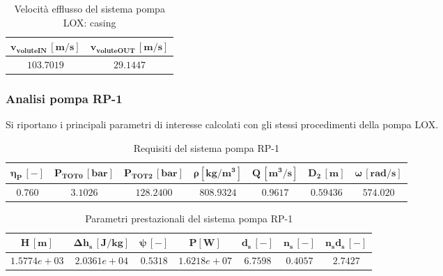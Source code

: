 \begin{table}[H]
\centering
\begin{tabular}{|c|c|}
\hline
$\bm{v_{voluteIN} \, [m/s]}$ & $\bm{v_{voluteOUT} \, [m/s]}$  \\
\hline
$103.7019$ & $29.1447$   \\
\hline
\end{tabular}

\caption{Velocità efflusso del sistema pompa LOX: casing}
\label{table:LOX pump casing}

\end{table}

\subsubsection{Analisi pompa RP-1}
Si riportano i principali parametri di interesse calcolati con gli stessi procedimenti della pompa LOX.

\begin{table}[H]
\centering
\begin{tabular}{|c|c|c|c|c|c|c|}
\hline
$\bm{\eta_P \, [-]}$ & $\bm{P_ {TOT0} \, [bar]}$ & $\bm{P_{TOT2} \, [bar]}$ & $\bm{\rho [kg/m^3]}$ & $\bm{Q \, [m^3/s]}$ & $\bm{D_2 \, [m]}$ & $\bm{\omega \, [rad/s]}$  \\
\hline
$0.760$ & $3.1026$ & $128.2400$ &  $808.9324$ & $0.9617$ & $0.59436$ & $574.020$  \\
\hline
\end{tabular}

\caption{Requisiti del sistema pompa RP-1 \cite{turbopump_manual}}
\label{table:RP-1 pump specs}

\end{table}

\begin{table}[H]
\centering
\begin{tabular}{|c|c|c|c|c|c|c|}
\hline
$\bm{H \, [m]}$ & $\bm{\Delta h_s \, [J/kg]}$ & $\bm{\psi \, [-]}$ & $\bm{P [W]}$ & $\bm{d_s \, [-]}$ & $\bm{n_s \, [-]}$ & $\bm{n_s d_s \, [-]}$  \\
\hline
$1.5774e+03$ & $2.0361e+04$ & $0.5318$ &  $1.6218e+07$ & $6.7598$ & $0.4057$ & $2.7427$  \\
\hline
\end{tabular}

\caption{Parametri prestazionali del sistema pompa RP-1}
\label{table:RP-1 pump performance}

\end{table}

